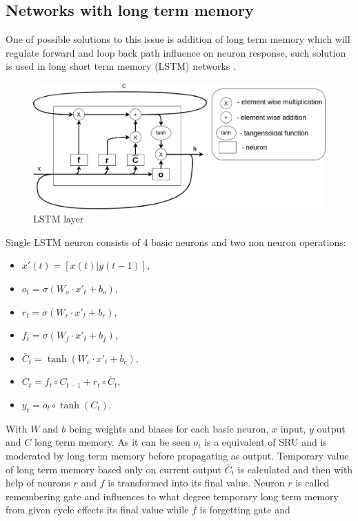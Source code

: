 \subsection{Networks with long term memory}
\FloatBarrier
One of possible solutions to this issue is addition of long term memory which will regulate
forward and loop back path influence on neuron response, such solution is used in long short
term memory (LSTM) networks \cite{Hochreiter1997}.
\begin{figure}[htb] 
	\label{fig:lstm}
	\includegraphics[width=\textwidth]{figures/lstm}
	\caption{LSTM layer}
\end{figure}
Single LSTM neuron consists of 4 basic neurons and two non neuron operations:
\begin{itemize}
\item $x'(t)=[x(t)|y(t-1)]$,
\item $o_t=\sigma (W_o\cdot x'_t+b_o)$,
\item $r_t=\sigma (W_r\cdot x'_t+b_r)$,
\item $f_t=\sigma (W_f\cdot x'_t+b_f)$,
\item $\bar{C}_t=\tanh (W_c\cdot x'_t+b_c)$,
\item $C_t=f_t\circ C_{t-1}+r_t\circ \bar{C}_t$,
\item $y_t=o_t\circ \tanh (C_t)$.
\end{itemize}
With $W$ and $b$ being weights and biases for each basic neuron, $x$ input, $y$ output and
$C$ long term memory. As it can be seen $o_t$ is a equivalent of SRU and is moderated by
long term memory before propagating as output. Temporary value of long term memory based
only on current output $\bar{C}_t$ is calculated and then with help of neurons $r$ and $f$
is transformed into its final value.
Neuron $r$ is called remembering gate and influences to what degree temporary long term
memory from given cycle effects its final value while $f$ is forgetting gate and
